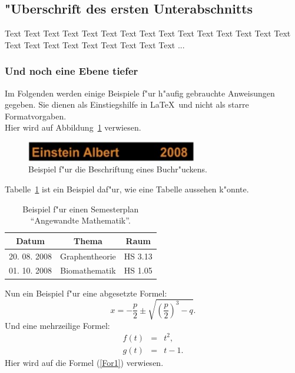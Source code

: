\documentclass[a4paper,bibtotoc,oneside]{scrbook}
\begin{document}
\subsection[Erster Unterabschnitt]{"Uberschrift des ersten Unterabschnitts}

Text Text Text Text Text Text Text Text Text Text Text Text Text Text Text Text Text Text Text Text Text Text Text Text ...

\subsubsection[Erster Unter-Unterabschnitt]{Und noch eine Ebene tiefer} 

Im Folgenden werden einige Beispiele f"ur h"aufig gebrauchte Anweisungen gegeben. Sie dienen als Einstiegshilfe in \LaTeX\ und 
nicht als starre Formatvorgaben.  
\\[2\baselineskip]
Hier wird auf Abbildung~\ref{Abb1} verwiesen. 
\begin{figure}[htbp]
\centering
\includegraphics[width=75mm]{Buchruecken}
\caption[Beschriftung eines Buchr"uckens.]{Beispiel f"ur die Beschriftung eines Buchr"uckens.}\label{Abb1}
\end{figure}
Tabelle~\ref{Tab1} ist ein Beispiel daf"ur, wie eine Tabelle aussehen k"onnte.
\begin{table}[htbp]
\centering
\begin{tabular}{ | c | c | c | }\hline
{\bf Datum} & {\bf Thema} & {\bf Raum}\\ \hline
\hline
20. 08. 2008 & Graphentheorie & HS 3.13\\ \hline
01. 10. 2008 & Biomathematik & HS 1.05\\ \hline
\end{tabular}
\caption[Semesterplan "`Angewandte Mathematik"'.]{Beispiel f"ur einen Semesterplan "`Angewandte Mathematik"'.}\label{Tab1}
\end{table}

\noindent
Nun ein Beispiel f"ur eine abgesetzte Formel:
\begin{equation}
x =  - \frac{p}{2} \pm \sqrt{\left(\frac{p}{2}\right)^3 - q}.
\end{equation}
Und eine mehrzeilige Formel:
\begin{eqnarray}
f(t)&=& t^2 \label{For1},\\
g(t) &=& t-1.
\end{eqnarray}
Hier wird auf die Formel (\ref{For1}) verwiesen. \\
\end{document}
